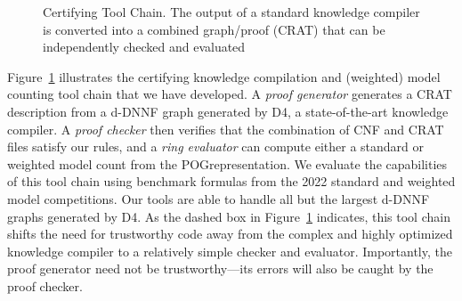 \documentclass[letterpaper,USenglish,cleveref, autoref, thm-restate]{lipics-v2021}
\newcommand{\progname}[1]{\textsc{#1}}
\newcommand{\dfour}{\progname{D4}}
\begin{document}
\begin{figure}
\caption{Certifying Tool Chain.
  The output of a standard knowledge compiler is converted into a combined graph/proof (CRAT) that can be independently checked and evaluated}
\label{fig:chain}
\end{figure}


Figure~\ref{fig:chain} illustrates the certifying knowledge compilation
and (weighted) model counting tool chain that we have developed.  A
{\em proof generator} generates a CRAT description from a d-DNNF
graph generated by \dfour{}, a state-of-the-art knowledge compiler.
A {\em proof checker} then verifies that the combination of CNF and CRAT files
satisfy our rules, and a {\em ring evaluator} can compute
either a standard or weighted model count from the POG\@ representation.
We evaluate the capabilities of this tool chain using
benchmark formulas from the 2022 standard and weighted model
competitions.  Our tools are able to handle all but the largest d-DNNF
graphs generated by \dfour{}.
As the dashed box in Figure~\ref{fig:chain} indicates, this tool chain
shifts the need for trustworthy code away from the complex and highly
optimized knowledge compiler to a relatively simple checker and
evaluator.  Importantly, the proof generator need not be
trustworthy---its errors will also be caught by the proof checker.
\end{document}
